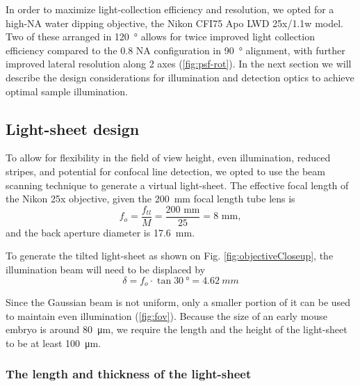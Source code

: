     

    In order to maximize light-collection efficiency and resolution, we opted for a high-NA water dipping objective, the Nikon CFI75 Apo LWD 25x/1.1w model. Two of these arranged in \SI{120}{\degree} allows for twice improved light collection efficiency compared to the 0.8 NA configuration in \SI{90}{\degree} alignment, with further improved lateral resolution along 2 axes (\autoref{fig:psf-rot}). In the next section we will describe the design considerations for illumination and detection optics to achieve optimal sample illumination.

  \subsection{Light-sheet design}
    \label{sec:ls-design}
    To allow for flexibility in the field of view height, even illumination, reduced stripes, and potential for confocal line detection, we opted to use the beam scanning technique to generate a virtual light-sheet. The effective focal length of the Nikon 25x objective, given the \SI{200}{mm} focal length tube lens is
    \begin{equation}
    f_{o} = \frac{f_{tl}}{M} = \frac{200\text{  mm}}{25} = 8 \text{  mm},
    \end{equation}
    and the back aperture diameter is \SI{17.6}{mm}.
    
    To generate the tilted light-sheet as shown on Fig. \ref{fig:objectiveCloseup}, the illumination beam will need to be displaced by
    \begin{equation}
      \delta = f_o \cdot \tan \SI{30}{\degree} = \SI{4.62}{mm}
    \end{equation}
    
    Since the Gaussian beam is not uniform, only a smaller portion of it can be used to maintain even illumination (\autoref{fig:fov}). Because the size of an early mouse embryo is around \SI{80}{\micro m}, we require the length and the height of the light-sheet to be at least \SI{100}{\micro m}.
    

    \subsubsection{The length and thickness of the light-sheet}
    
